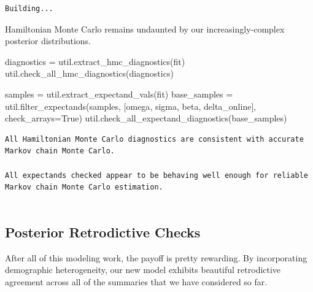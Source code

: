 \documentclass[
  letterpaper,
  DIV=11,
  numbers=noendperiod]{scrartcl}
\newenvironment{Shaded}{\begin{snugshade}}{\end{snugshade}}
\newcommand{\NormalTok}[1]{\textcolor[rgb]{0.00,0.23,0.31}{#1}}
\newcommand{\OperatorTok}[1]{\textcolor[rgb]{0.37,0.37,0.37}{#1}}
\newcommand{\StringTok}[1]{\textcolor[rgb]{0.13,0.47,0.30}{#1}}
\newcommand{\VariableTok}[1]{\textcolor[rgb]{0.07,0.07,0.07}{#1}}
\begin{document}
\begin{verbatim}
Building...
\end{verbatim}

Hamiltonian Monte Carlo remains undaunted by our increasingly-complex
posterior distributions.

\begin{Shaded}
\begin{Highlighting}[]
\NormalTok{diagnostics }\OperatorTok{=}\NormalTok{ util.extract\_hmc\_diagnostics(fit)}
\NormalTok{util.check\_all\_hmc\_diagnostics(diagnostics)}

\NormalTok{samples }\OperatorTok{=}\NormalTok{ util.extract\_expectand\_vals(fit)}
\NormalTok{base\_samples }\OperatorTok{=}\NormalTok{ util.filter\_expectands(samples,}
\NormalTok{                                      [}\StringTok{\textquotesingle{}omega\textquotesingle{}}\NormalTok{, }\StringTok{\textquotesingle{}sigma\textquotesingle{}}\NormalTok{,}
                                       \StringTok{\textquotesingle{}beta\textquotesingle{}}\NormalTok{, }\StringTok{\textquotesingle{}delta\_online\textquotesingle{}}\NormalTok{],}
\NormalTok{                                      check\_arrays}\OperatorTok{=}\VariableTok{True}\NormalTok{)}
\NormalTok{util.check\_all\_expectand\_diagnostics(base\_samples)}
\end{Highlighting}
\end{Shaded}

\begin{verbatim}
All Hamiltonian Monte Carlo diagnostics are consistent with accurate
Markov chain Monte Carlo.
 
All expectands checked appear to be behaving well enough for reliable
Markov chain Monte Carlo estimation.
 
\end{verbatim}

\subsection{Posterior Retrodictive
Checks}\label{posterior-retrodictive-checks-3}

After all of this modeling work, the payoff is pretty rewarding. By
incorporating demographic heterogeneity, our new model exhibits
beautiful retrodictive agreement across all of the summaries that we
have considered so far.
\end{document}

